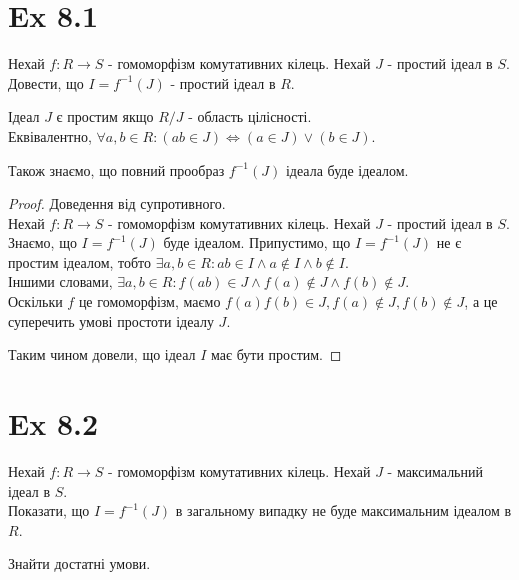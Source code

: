 \documentclass[11pt, a4paper]{article} %
\begin{document}
\section*{Ex 8.1}
\begin{mdframed}
    Нехай $f: R \to S$ - гомоморфізм комутативних кілець.
    Нехай $J$ - простий ідеал в $S$. \\
    Довести, що $I = f^{-1}(J)$ - простий ідеал в $R$.
\end{mdframed}

\begin{mdframed}[backgroundcolor=purple!20]
    Ідеал $J$ є простим якщо $R/J$ - область цілісності.\\
    Еквівалентно, $\forall a,b \in R: (ab\in J) \iff (a\in J)\vee(b\in J)$.

    Також знаємо, що повний прообраз $f^{-1}(J)$ ідеала буде ідеалом.


\end{mdframed}

\begin{proof}
    Доведення від супротивного.\\
    Нехай $f: R \to S$ - гомоморфізм комутативних кілець.
    Нехай $J$ - простий ідеал в $S$.
    Знаємо, що $I = f^{-1}(J)$ буде ідеалом. 
    Припустимо, що $I = f^{-1}(J)$ не є простим ідеалом, тобто
    $\exists a,b \in R: ab \in I \land a\notin I \land b \notin I$.\\
    Іншими словами,
    $\exists a,b \in R: f(ab) \in J \land f(a) \notin J \land f(b) \notin J$.\\
    Оскільки $f$ це гомоморфізм, маємо $f(a)f(b) \in J, f(a)\notin J, f(b)\notin J$, а це суперечить умові простоти ідеалу $J$.

    Таким чином довели, що ідеал $I$ має бути простим.
\end{proof}

\section*{Ex 8.2}
\begin{mdframed}
    Нехай $f: R \to S$ - гомоморфізм комутативних кілець.
    Нехай $J$ - максимальний ідеал в $S$. \\
    Показати, що $I = f^{-1}(J)$ в загальному випадку не буде максимальним ідеалом в $R$.

    Знайти достатні умови.
\end{mdframed}
\end{document}
